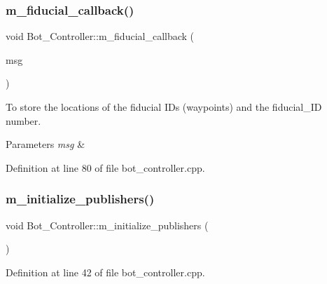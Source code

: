 \subsubsection{\texorpdfstring{m\+\_\+fiducial\+\_\+callback()}{m\_fiducial\_callback()}}
{\footnotesize\ttfamily void Bot\+\_\+\+Controller\+::m\+\_\+fiducial\+\_\+callback (\begin{DoxyParamCaption}\item[{const fiducial\+\_\+msgs\+::\+Fiducial\+Transform\+Array\+::\+Const\+Ptr \&}]{msg }\end{DoxyParamCaption})\hspace{0.3cm}{\ttfamily [protected]}}



To store the locations of the fiducial I\+Ds (waypoints) and the fiducial\+\_\+\+ID number. 


\begin{DoxyParams}{Parameters}
{\em msg} & \\
\hline
\end{DoxyParams}


Definition at line 80 of file bot\+\_\+controller.\+cpp.

\mbox{\label{class_bot___controller_ab8d1e3dd6aced881ebcc76e32aaf0910}} 
\subsubsection{\texorpdfstring{m\+\_\+initialize\+\_\+publishers()}{m\_initialize\_publishers()}}
{\footnotesize\ttfamily void Bot\+\_\+\+Controller\+::m\+\_\+initialize\+\_\+publishers (\begin{DoxyParamCaption}{ }\end{DoxyParamCaption})\hspace{0.3cm}{\ttfamily [protected]}}



Definition at line 42 of file bot\+\_\+controller.\+cpp.

\mbox{\label{class_bot___controller_a90bb076f647b36f2cf5b5e57ae98ce41}} 
